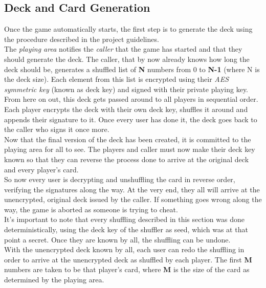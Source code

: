 \documentclass[11pt]{article}
\begin{document}
\subsection{Deck and Card Generation}
Once the game automatically starts, the first step is to generate the deck using the procedure described in the project guidelines.\\
The \emph{playing area} notifies the \emph{caller} that the game has started and that they should generate the deck. The caller, that by now already knows how long the deck should be, generates a shuffled list of \textbf{N} numbers from 0 to \textbf{N-1} (where N is the deck size). Each element from this list is encrypted using their \emph{AES symmetric key} (known as deck key) and signed with their private playing key. \\
From here on out, this deck gets passed around to all players in sequential order. Each player encrypts the deck with their own deck key, shuffles it around and appends their signature to it. Once every user has done it, the deck goes back to the caller who signs it once more. \\
Now that the final version of the deck has been created, it is committed to the playing area for all to see. The players and caller must now make their deck key known so that they can reverse the process done to arrive at the original deck and every player’s card. \\
So now every user is decrypting and unshuffling the card in reverse order, verifying the signatures along the way. At the very end, they all will arrive at the unencrypted, original deck issued by the caller. If something goes wrong along the way, the game is aborted as someone is trying to cheat. \\
It’s important to note that every shuffling described in this section was done deterministically, using the deck key of the shuffler as seed, which was at that point a secret. Once they are known by all, the shuffling can be undone.\\
With the unencrypted deck known by all, each user can redo the shuffling in order to arrive at the unencrypted deck as shuffled by each player. The first \textbf{M} numbers are taken to be that player’s card, where \textbf{M} is the size of the card as determined by the playing area.
\end{document}
